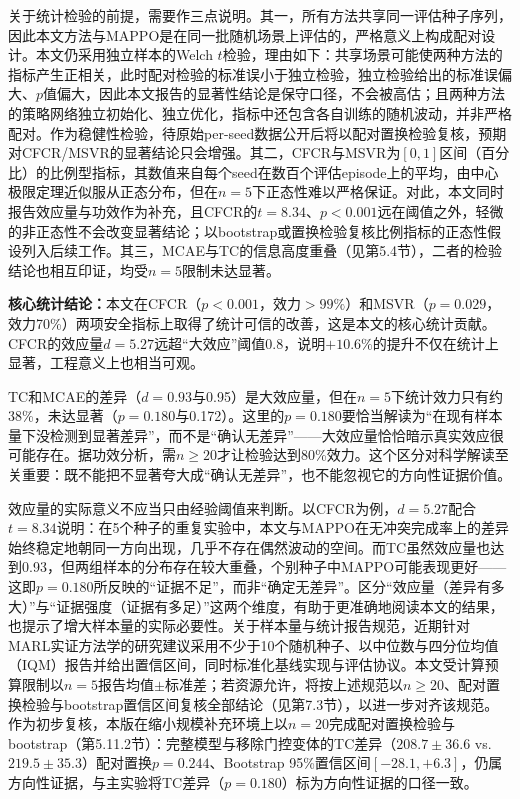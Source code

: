\documentclass[12pt,a4paper,UTF8]{ctexart}
\begin{document}
关于统计检验的前提，需要作三点说明。其一，所有方法共享同一评估种子序列，因此本文方法与MAPPO是在同一批随机场景上评估的，严格意义上构成配对设计。本文仍采用独立样本的Welch $t$检验，理由如下：共享场景可能使两种方法的指标产生正相关，此时配对检验的标准误小于独立检验，独立检验给出的标准误偏大、$p$值偏大，因此本文报告的显著性结论是保守口径，不会被高估；且两种方法的策略网络独立初始化、独立优化，指标中还包含各自训练的随机波动，并非严格配对。作为稳健性检验，待原始per-seed数据公开后将以配对置换检验复核，预期对CFCR/MSVR的显著结论只会增强。其二，CFCR与MSVR为$[0,1]$区间（百分比）的比例型指标，其数值来自每个seed在数百个评估episode上的平均，由中心极限定理近似服从正态分布，但在$n=5$下正态性难以严格保证。对此，本文同时报告效应量与功效作为补充，且CFCR的$t=8.34$、$p<0.001$远在阈值之外，轻微的非正态性不会改变显著结论；以bootstrap或置换检验复核比例指标的正态性假设列入后续工作。其三，MCAE与TC的信息高度重叠（见第5.4节），二者的检验结论也相互印证，均受$n=5$限制未达显著。

\textbf{核心统计结论：}本文在CFCR（$p<0.001$，效力$>99\%$）和MSVR（$p=0.029$，效力70\%）两项安全指标上取得了统计可信的改善，这是本文的核心统计贡献。CFCR的效应量$d=5.27$远超“大效应”阈值0.8，说明$+10.6\%$的提升不仅在统计上显著，工程意义上也相当可观。

TC和MCAE的差异（$d=0.93$与0.95）是大效应量，但在$n=5$下统计效力只有约38\%，未达显著（$p=0.180$与0.172）。这里的$p=0.180$要恰当解读为“在现有样本量下没检测到显著差异”，而不是“确认无差异”——大效应量恰恰暗示真实效应很可能存在。据功效分析，需$n\geq20$才让检验达到80\%效力。这个区分对科学解读至关重要：既不能把不显著夸大成“确认无差异”，也不能忽视它的方向性证据价值。

效应量的实际意义不应当只由经验阈值来判断。以CFCR为例，$d=5.27$配合$t=8.34$说明：在5个种子的重复实验中，本文与MAPPO在无冲突完成率上的差异始终稳定地朝同一方向出现，几乎不存在偶然波动的空间。而TC虽然效应量也达到0.93，但两组样本的分布存在较大重叠，个别种子中MAPPO可能表现更好——这即$p=0.180$所反映的“证据不足”，而非“确定无差异”。区分“效应量（差异有多大）”与“证据强度（证据有多足）”这两个维度，有助于更准确地阅读本文的结果，也提示了增大样本量的实际必要性。关于样本量与统计报告规范，近期针对MARL实证方法学的研究\cite{ref59}建议采用不少于10个随机种子、以中位数与四分位均值（IQM）报告并给出置信区间，同时标准化基线实现与评估协议。本文受计算预算限制以$n=5$报告均值$\pm$标准差；若资源允许，将按上述规范以$n\geq20$、配对置换检验与bootstrap置信区间复核全部结论（见第7.3节），以进一步对齐该规范。作为初步复核，本版在缩小规模补充环境上以$n=20$完成配对置换检验与bootstrap（第5.11.2节）：完整模型与移除门控变体的TC差异（$208.7\pm36.6$ vs.\ $219.5\pm35.3$）配对置换$p=0.244$、Bootstrap 95\%置信区间$[-28.1,+6.3]$，仍属方向性证据，与主实验将TC差异（$p=0.180$）标为方向性证据的口径一致。
\end{document}
